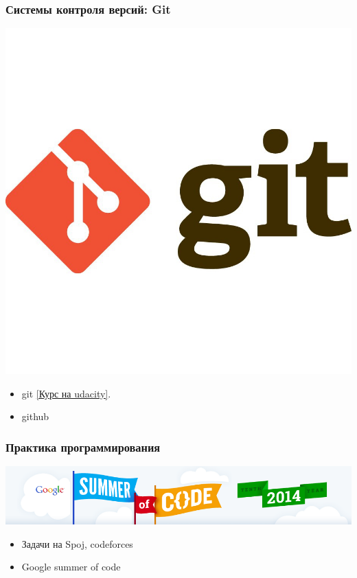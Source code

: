 \documentclass[14pt,pdf,hyperref={unicode}]{beamer}
\begin{document}
\begin{frame}[fragile]
\frametitle{Системы контроля версий: Git} 
\begin{center}
\includegraphics[width=0.4\linewidth]{images/git.jpg}
\end{center}
\begin{itemize}
\item git
\href{https://www.udacity.com/course/how-to-use-git-and-github--ud775}{[Курс на udacity]}.
\item github
\end{itemize}
\end{frame}


\begin{frame}[fragile]
\frametitle{Практика программирования} 
\begin{center}
\includegraphics[width=0.4\linewidth]{images/gsoc.png}
\end{center}
\begin{itemize}
\item Задачи на Spoj, codeforces
\item Google summer of code
\end{itemize}
\end{frame}
\end{document}
